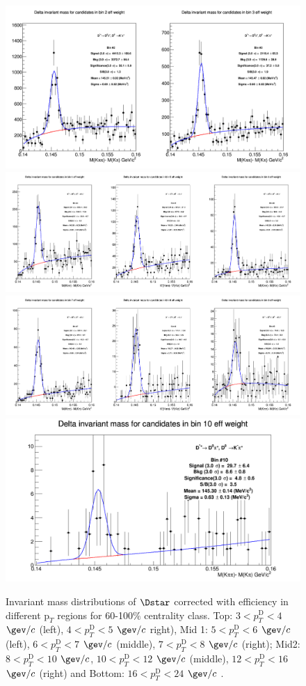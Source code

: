 \begin{figure}[!htp]
\centering
{\includegraphics[width=0.7\linewidth]{figuresVsCent/Dstar/MassPlots/60100/InvMassDistributions_Dstar_Bins2to3.png}}
{\includegraphics[width=0.9\linewidth]{figuresVsCent/Dstar/MassPlots/60100/InvMassDistributions_Dstar_Bins4to6.png}}
{\includegraphics[width=0.9\linewidth]{figuresVsCent/Dstar/MassPlots/60100/InvMassDistributions_Dstar_Bins7to9.png}}
{\includegraphics[width=0.6\linewidth]{figuresVsCent/Dstar/MassPlots/60100/InvMassDistributions_Dstar_Bins10to10.png}}

\caption{Invariant mass distributions of $\Dstar$ corrected with efficiency in different $\text{p}_T$ regions for 60-100$\%$ centrality class. Top: $3< p_{T}^{\text{D}}< 4$ $\gev/c$ (left), $4< p_{T}^{\text{D}}< 5$ $\gev/c$ right), Mid 1: $5< p_{T}^{\text{D}}< 6$ $\gev/c$ (left), $6 < p_{T}^{\text{D}} < 7$ $\gev/c$ (middle), $7< p_{T}^{\text{D}}< 8$ $\gev/c$ (right); Mid2: $8< p_{T}^{\text{D}}< 10$ $\gev/c$, $10< p_{T}^{\text{D}}< 12$ $\gev/c$  (middle), $12 < p_{T}^{\text{D}}< 16$ $\gev/c$  (right) and Bottom: $16<p_{T}^{\text{D}}< 24$ $\gev/c$ .}
\label{fig:InvMassDs60100}
\end{figure}

